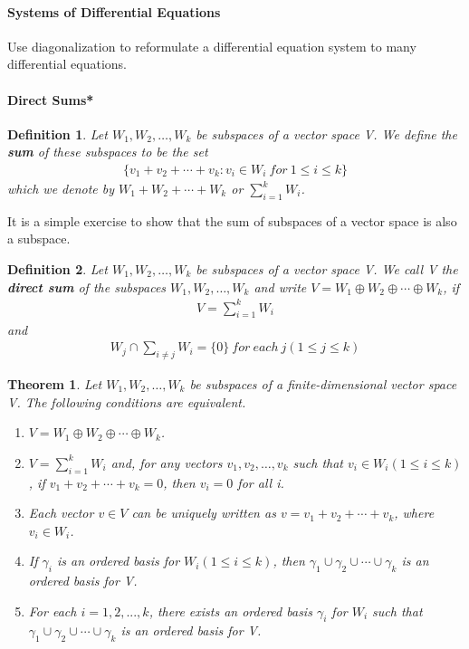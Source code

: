 \documentclass{article}
\newcommand{\bd}[1]{\textbf{#1}}
\theoremstyle{plain}
\newtheorem{theorem}{Theorem}[section]
\newtheorem*{definition1}{Definition}
\theoremstyle{plain} %
\begin{document}
\paragraph{Systems of Differential Equations}

Use diagonalization to reformulate a differential equation system to many differential equations.

\paragraph{Direct Sums*}

\begin{definition1}
Let $W_1, W_2,\ldots, W_k$ be subspaces of a vector space V. We define the \bd{sum} of these subspaces to be the set
\begin{align*}
  \{v_1+v_2+\cdots+v_k:v_i\in W_i~for~1\leq i\leq k\}
\end{align*}
which we denote by $W_1 + W_2 + \cdots + W_k$ or $\sum_{i=1}^k W_i$.
\end{definition1}

It is a simple exercise to show that the sum of subspaces of a vector space
is also a subspace.

\begin{definition1}
  Let $W_1, W_2,\ldots, W_k$ be subspaces of a vector space V. We call V the \bd{direct sum} of the subspaces $W_1, W_2,\ldots, W_k$ and write $V = W_1 \oplus W_2 \oplus \cdots \oplus W_k$, if
  \begin{align*}
    V=\sum_{i=1}^k W_i
  \end{align*}
  and
  \begin{align*}
    W_j\cap \sum_{i\neq j}W_i=\{0\}~for~each~j(1\leq j\leq k)
  \end{align*}
\end{definition1}

\begin{theorem}
  Let $W_1, W_2,\ldots, W_k$ be subspaces of a finite-dimensional vector space V. The following conditions are equivalent.
  \begin{enumerate}[label=(\alph*)]
    \item $V=W_1\oplus W_2 \oplus \cdots \oplus W_k$.
    \item $V=\sum_{i=1}^k W_i$ and, for any vectors $v_1,v_2,\ldots,v_k$ such that $v_i\in W_i(1\leq i\leq k)$, if $v_1+v_2+\cdots+v_k=0$, then $v_i=0$ for all i.
    \item Each vector $v \in V$ can be uniquely written as $v = v_1 + v_2 + \cdots + v_k$, where $v_i \in W_i$.
    \item If $\gamma_i$ is an ordered basis for $W_i (1 \leq i \leq k)$, then $\gamma_1 \cup \gamma_2 \cup\cdots\cup \gamma_k$ is an ordered basis for V.
    \item For each $i = 1, 2,...,k$, there exists an ordered basis $\gamma_i$ for $W_i$ such that $\gamma_1 \cup \gamma_2 \cup\cdots\cup \gamma_k$ is an ordered basis for V.
  \end{enumerate}
\end{theorem}
\end{document}
